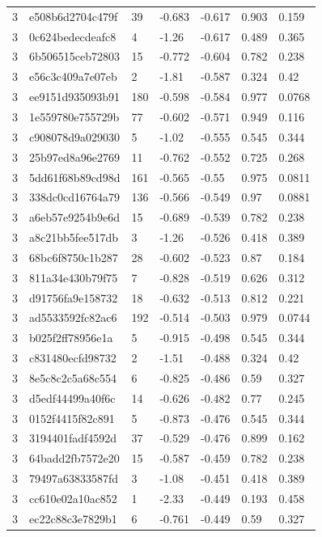 \begin{tabular}{lllllll}
3 & e508b6d2704c479f & 39 & -0.683 & -0.617 & 0.903 & 0.159 \\
3 & 0c624bedecdeafc8 & 4 & -1.26 & -0.617 & 0.489 & 0.365 \\
3 & 6b506515ceb72803 & 15 & -0.772 & -0.604 & 0.782 & 0.238 \\
3 & e56c3c409a7e07eb & 2 & -1.81 & -0.587 & 0.324 & 0.42 \\
3 & ee9151d935093b91 & 180 & -0.598 & -0.584 & 0.977 & 0.0768 \\
3 & 1e559780e755729b & 77 & -0.602 & -0.571 & 0.949 & 0.116 \\
3 & c908078d9a029030 & 5 & -1.02 & -0.555 & 0.545 & 0.344 \\
3 & 25b97ed8a96e2769 & 11 & -0.762 & -0.552 & 0.725 & 0.268 \\
3 & 5dd61f68b89cd98d & 161 & -0.565 & -0.55 & 0.975 & 0.0811 \\
3 & 338dc0cd16764a79 & 136 & -0.566 & -0.549 & 0.97 & 0.0881 \\
3 & a6eb57e9254b9e6d & 15 & -0.689 & -0.539 & 0.782 & 0.238 \\
3 & a8c21bb5fee517db & 3 & -1.26 & -0.526 & 0.418 & 0.389 \\
3 & 68bc6f8750c1b287 & 28 & -0.602 & -0.523 & 0.87 & 0.184 \\
3 & 811a34e430b79f75 & 7 & -0.828 & -0.519 & 0.626 & 0.312 \\
3 & d91756fa9e158732 & 18 & -0.632 & -0.513 & 0.812 & 0.221 \\
3 & ad5533592fc82ac6 & 192 & -0.514 & -0.503 & 0.979 & 0.0744 \\
3 & b025f2ff78956e1a & 5 & -0.915 & -0.498 & 0.545 & 0.344 \\
3 & c831480ecfd98732 & 2 & -1.51 & -0.488 & 0.324 & 0.42 \\
3 & 8e5c8c2c5a68c554 & 6 & -0.825 & -0.486 & 0.59 & 0.327 \\
3 & d5edf44499a40f6c & 14 & -0.626 & -0.482 & 0.77 & 0.245 \\
3 & 0152f4415f82c891 & 5 & -0.873 & -0.476 & 0.545 & 0.344 \\
3 & 3194401fadf4592d & 37 & -0.529 & -0.476 & 0.899 & 0.162 \\
3 & 64badd2fb7572e20 & 15 & -0.587 & -0.459 & 0.782 & 0.238 \\
3 & 79497a63833587fd & 3 & -1.08 & -0.451 & 0.418 & 0.389 \\
3 & cc610e02a10ac852 & 1 & -2.33 & -0.449 & 0.193 & 0.458 \\
3 & ec22c88c3e7829b1 & 6 & -0.761 & -0.449 & 0.59 & 0.327 \\

\end{tabular}
